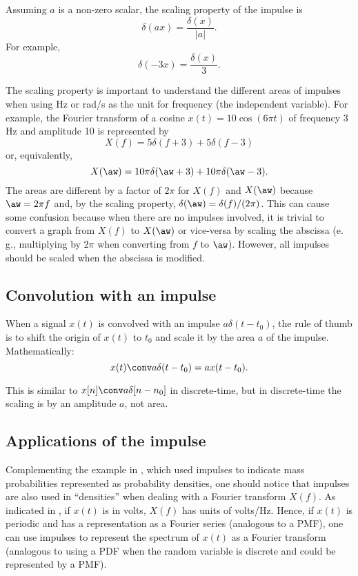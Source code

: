 Assuming $a$ is a non-zero scalar, the scaling property of the impulse is
\[
\delta(ax) = \frac{\delta(x)}{|a|}.
\]
For example,
\[
\delta(-3x) = \frac{\delta(x)}{3}.
\]

The scaling property is important to understand the different areas of impulses when using Hz or rad/s as the unit for frequency (the independent variable). For example, the Fourier transform of a cosine $x(t)=10\cos(6 \pi t)$ of frequency 3 Hz and amplitude 10 is represented by 
\[
X(f) = 5\delta(f+3) + 5\delta(f-3)
\]
or, equivalently,
\[
X(\aw) = 10 \pi \delta(\aw+3) + 10 \pi \delta(\aw-3).
\]
The areas are different by a factor of $2 \pi$ for $X(f)$ and $X(\aw)$ because $\aw = 2 \pi f$ and, by the scaling property, $\delta(\aw)=\delta(f)/(2\pi)$. This can cause some confusion because when there are no impulses involved, it is trivial to convert a graph from $X(f)$ to $X(\aw)$ or vice-versa by scaling the abscissa (e.\,g., multiplying by $2\pi$ when converting from $f$ to $\aw$). However, all impulses should be scaled when the abscissa is modified.

\subsection{Convolution with an impulse}

When a signal $x(t)$ is convolved with an impulse $a \delta(t-t_0)$, the rule of thumb is to shift the origin of $x(t)$ to $t_0$ and scale it by the area $a$ of the impulse. Mathematically:
\[
x(t) \conv a \delta(t-t_0) = a x(t-t_0).
\]

This is similar to $x[n] \conv a \delta[n-n_0]$ in discrete-time, but in discrete-time the scaling is by an amplitude $a$, not area.

\subsection{Applications of the impulse}

Complementing the example in , which used impulses to indicate mass probabilities represented as probability densities, one should notice that impulses are also used in ``densities'' when dealing with a Fourier transform $X(f)$. As indicated in , if $x(t)$ is in volts, $X(f)$ has units of volts/Hz. Hence, if $x(t)$ is periodic and has a representation as a Fourier series (analogous to a PMF), one can use impulses to represent the spectrum of $x(t)$ as a Fourier transform (analogous to using a PDF when the random variable is discrete and could be represented by a PMF). %

